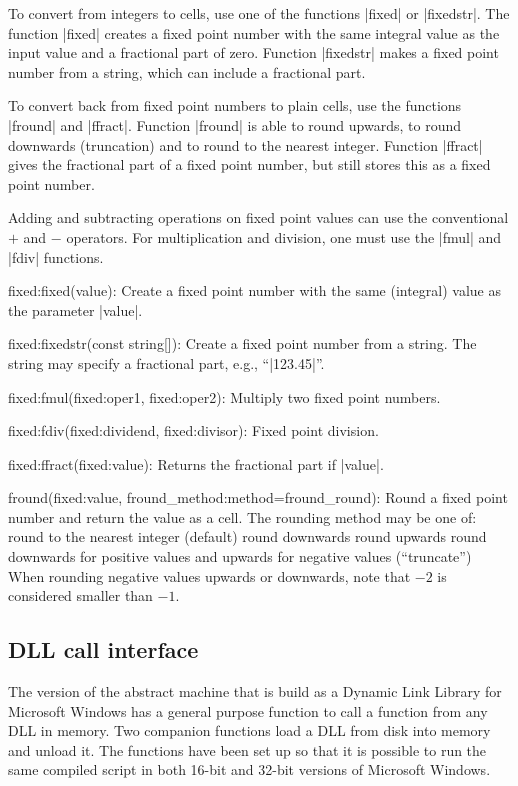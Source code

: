 To convert from integers to cells, use one of the functions |fixed| or
|fixedstr|. The function |fixed| creates a fixed point number with the same
integral value as the input value and a fractional part of zero. Function
|fixedstr| makes a fixed point number from a string, which can include a
fractional part.

To convert back from fixed point numbers to plain cells, use the functions
|fround| and |ffract|. Function |fround| is able to round upwards, to round
downwards (truncation) and to round to the nearest integer. Function |ffract|
gives the fractional part of a fixed point number, but still stores this as
a fixed point number.

Adding and subtracting operations on fixed point values can use the
conventional $+$ and $-$ operators. For multiplication and division, one must
use the |fmul| and |fdiv| functions.

\beginlist{35pt}
\def\tag#1{{#1}:}%
\item \tag{fixed}fixed(value):
  Create a fixed point number with the same (integral) value as the parameter
  |value|.
\item \tag{fixed}fixedstr(const string[]):
  Create a fixed point number from a string. The string may specify a
  fractional part, e.g., ``|123.45|''.
\item \tag{fixed}fmul(\tag{fixed}oper1, \tag{fixed}oper2):
  Multiply two fixed point numbers.
\item \tag{fixed}fdiv(\tag{fixed}dividend, \tag{fixed}divisor):
  Fixed point division.
\item \tag{fixed}ffract(\tag{fixed}value):
  Returns the fractional part if |value|.
\item fround(\tag{fixed}value, \tag{fround_method}method=fround_round):
  Round a fixed point number and return the value as a cell. The rounding
  method may be one of:
  \beginlist{65 pt}\compactlist
   round to the nearest integer (default)
   round downwards
   round upwards
   round downwards for positive values and upwards for
        negative values (``truncate'')
  \endlist
  When rounding negative values upwards or downwards, note that $-2$ is
  considered smaller than $-1$.
\endlist

\subsection{DLL call interface}
The version of the abstract machine that is build as a Dynamic Link Library
for Microsoft Windows has a general purpose function to call a function from
any DLL in memory. Two companion functions load a DLL from disk into memory and
unload it. The functions have been set up so that it is possible to run the
same compiled script in both 16-bit and 32-bit versions of Microsoft Windows.

